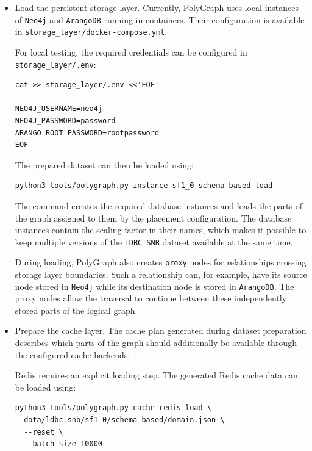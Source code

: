 \documentclass[11pt,a4paper]{article}
\begin{document}
\begin{itemize}
    \item Load the persistent storage layer. Currently, PolyGraph uses local
    instances of \texttt{Neo4j} and \texttt{ArangoDB} running in containers.
    Their configuration is available in
    \texttt{storage\_layer/docker-compose.yml}.

    For local testing, the required credentials can be configured in
    \texttt{storage\_layer/.env}:

\begin{lstlisting}[style=bash]
cat >> storage_layer/.env <<'EOF'

NEO4J_USERNAME=neo4j
NEO4J_PASSWORD=password
ARANGO_ROOT_PASSWORD=rootpassword
EOF
\end{lstlisting}

    The prepared dataset can then be loaded using:

\begin{lstlisting}[style=bash]
python3 tools/polygraph.py instance sf1_0 schema-based load
\end{lstlisting}

    The command creates the required database instances and loads the parts of
    the graph assigned to them by the placement configuration. The database
    instances contain the scaling factor in their names, which makes it
    possible to keep multiple versions of the \texttt{LDBC SNB} dataset
    available at the same time.

    During loading, PolyGraph also creates \texttt{proxy} nodes for
    relationships crossing storage layer boundaries. Such a relationship can,
    for example, have its source node stored in \texttt{Neo4j} while its
    destination node is stored in \texttt{ArangoDB}. The proxy nodes allow the
    traversal to continue between these independently stored parts of the
    logical graph.

    \item Prepare the cache layer. The cache plan generated during dataset
    preparation describes which parts of the graph should additionally be
    available through the configured cache backends.

    Redis requires an explicit loading step. The generated Redis cache data can
    be loaded using:

\begin{lstlisting}[style=bash]
python3 tools/polygraph.py cache redis-load \
  data/ldbc-snb/sf1_0/schema-based/domain.json \
  --reset \
  --batch-size 10000
\end{lstlisting}


\end{itemize}
\end{document}
